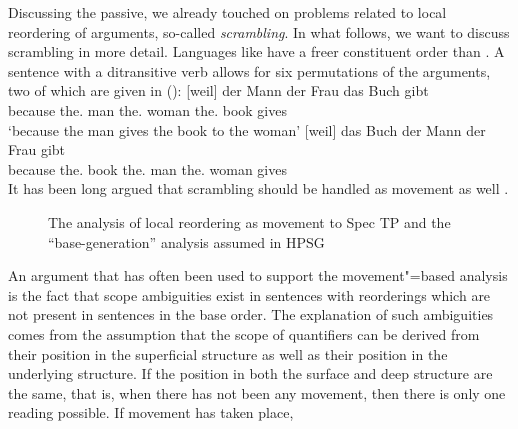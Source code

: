 \documentclass[output=paper
 	        ,biblatex
                ,babelshorthands
                ,newtxmath
                ,draftmode
                ,colorlinks, citecolor=brown
]{langscibook}
\begin{document}
Discussing the passive, we already touched on problems related to local reordering of arguments,
so-called \emph{scrambling}. In what follows, we want
to discuss scrambling in more detail. Languages like  have a freer constituent
order than . A sentence with a ditransitive verb allows for six permutations of
the arguments, two of which are given in ():
\eal
\label{ex-gb-umstellung}
\ex 
\gll {}[weil] der Mann der Frau das Buch gibt\\
     \spacebr{}because the.\nom{} man the.\dat{} woman the.\acc{} book gives\\
\glt `because the man gives the book to the woman'
\ex\label{ex-das-buch-der-mann-der-frau-gibt} 
\gll {}[weil] das Buch der Mann der Frau gibt\\
     \spacebr{}because the.\acc{} book the.\nom{} man the.\dat{} woman gives\\
\zl
It has been long argued that scrambling should be handled as movement as well \citep{Frey93a}.
\begin{figure}
\hfill
{}
\caption{The analysis of local reordering as movement to Spec TP and the ``base-generation'' analysis
  assumed in HPSG}\label{fig-das-buch-der-mann-der-frau-gibt-movement}
\end{figure}%
%
An argument that has often been used to support the movement"=based analysis is the fact that scope ambiguities
exist in sentences with reorderings which are not present in sentences in the base order. The
explanation of such ambiguities comes from the assumption that the scope of quantifiers can be
derived from their position in the superficial structure as well as their position in the underlying
structure. If the position in both the surface and deep structure are the same, that is, when there
has not been any movement, then there is only one reading possible. If movement has taken place,
\end{document}
